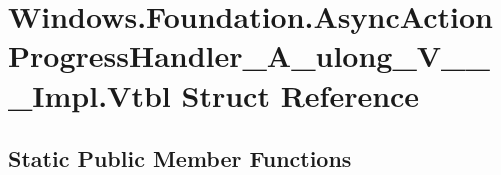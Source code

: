 \hypertarget{struct_windows_1_1_foundation_1_1_async_action_progress_handler___a__ulong___v_______impl_1_1_vtbl}{}\section{Windows.\+Foundation.\+Async\+Action\+Progress\+Handler\+\_\+\+A\+\_\+ulong\+\_\+\+V\+\_\+\+\_\+\+\_\+\+Impl.\+Vtbl Struct Reference}
\label{struct_windows_1_1_foundation_1_1_async_action_progress_handler___a__ulong___v_______impl_1_1_vtbl}
\subsection*{Static Public Member Functions}
